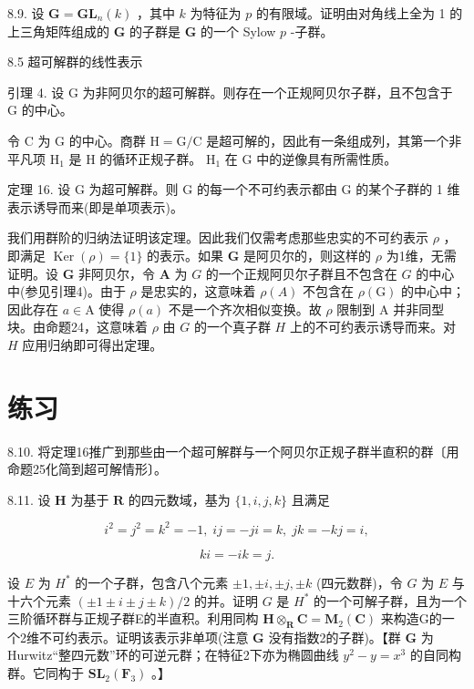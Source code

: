 \documentclass[10pt]{article}
\begin{document}
8.9. 设 \(\mathbf{G} = {\mathbf{{GL}}}_{n}\left( k\right)\) ，其中 \(k\) 为特征为 \(p\) 的有限域。证明由对角线上全为 1 的上三角矩阵组成的 \(\mathbf{G}\) 的子群是 \(\mathbf{G}\) 的一个 Sylow \(p\) -子群。

8.5 超可解群的线性表示

引理 4. 设 \(\mathrm{G}\) 为非阿贝尔的超可解群。则存在一个正规阿贝尔子群，且不包含于 \(\mathrm{G}\) 的中心。

令 \(\mathrm{C}\) 为 \(\mathrm{G}\) 的中心。商群 \(\mathrm{H} = \mathrm{G}/\mathrm{C}\) 是超可解的，因此有一条组成列，其第一个非平凡项 \({\mathrm{H}}_{1}\) 是 \(\mathrm{H}\) 的循环正规子群。 \({\mathrm{H}}_{1}\) 在 \(\mathrm{G}\) 中的逆像具有所需性质。

定理 16. 设 \(\mathrm{G}\) 为超可解群。则 \(\mathrm{G}\) 的每一个不可约表示都由 \(\mathrm{G}\) 的某个子群的 1 维表示诱导而来(即是单项表示)。

我们用群阶的归纳法证明该定理。因此我们仅需考虑那些忠实的不可约表示 \(\rho\) ，即满足 \(\operatorname{Ker}\left( \rho \right)  = \{ 1\}\) 的表示。如果 \(\mathbf{G}\) 是阿贝尔的，则这样的 \(\rho\) 为1维，无需证明。设 \(\mathbf{G}\) 非阿贝尔，令 \(\mathbf{A}\) 为 \(G\) 的一个正规阿贝尔子群且不包含在 \(G\) 的中心中(参见引理4)。由于 \(\rho\) 是忠实的，这意味着 \(\rho \left( A\right)\) 不包含在 \(\rho \left( \mathrm{G}\right)\) 的中心中；因此存在 \(a \in  \mathrm{A}\) 使得 \(\rho \left( a\right)\) 不是一个齐次相似变换。故 \(\rho\) 限制到 \(\mathrm{A}\) 并非同型块。由命题24，这意味着 \(\rho\) 由 \(G\) 的一个真子群 \(H\) 上的不可约表示诱导而来。对 \(H\) 应用归纳即可得出定理。

\section*{练习}

8.10. 将定理16推广到那些由一个超可解群与一个阿贝尔正规子群半直积的群〔用命题25化简到超可解情形〕。

8.11. 设 \(\mathbf{H}\) 为基于 \(\mathbf{R}\) 的四元数域，基为 \(\{ 1,i,j,k\}\) 且满足

\[
{i}^{2} = {j}^{2} = {k}^{2} =  - 1,\;{ij} =  - {ji} = k,\;{jk} =  - {kj} = i,
\]

\[
{ki} =  - {ik} = j.
\]

设 \(E\) 为 \({H}^{ * }\) 的一个子群，包含八个元素 \(\pm  1, \pm  i, \pm  j, \pm  k\) (四元数群)，令 \(G\) 为 \(E\) 与十六个元素 \(\left( {\pm 1 \pm  i \pm  j \pm  k}\right) /2\) 的并。证明 \(G\) 是 \({H}^{ * }\) 的一个可解子群，且为一个三阶循环群与正规子群E的半直积。利用同构 \(\mathbf{H}{ \otimes  }_{\mathbf{R}}\mathbf{C} = {\mathbf{M}}_{2}\left( \mathbf{C}\right)\) 来构造G的一个2维不可约表示。证明该表示非单项(注意 \(\mathbf{G}\) 没有指数2的子群)。【群 \(\mathbf{G}\) 为Hurwitz“整四元数”环的可逆元群；在特征2下亦为椭圆曲线 \({y}^{2} - y = {x}^{3}\) 的自同构群。它同构于 \({\mathbf{{SL}}}_{2}\left( {\mathbf{F}}_{3}\right)\) 。】
\end{document}
